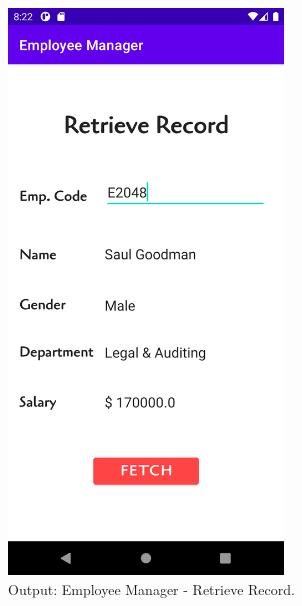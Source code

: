 \documentclass[12pt, a4]{article}
\begin{document}
\subsection*{}
\begin{figure}[h]
\centering
\caption{Output: Employee Manager - Retrieve Record.}
\includegraphics[height=15cm, width=7.3cm]{EmployeeManager/Screenshots/Output-3.png}
\end{figure}

\newpage
\end{document}
